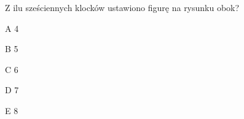 \begin{tresc}
Z ilu sześciennych klocków ustawiono figurę na rysunku obok?
\end{tresc}
\begin{wariant}{A} 4 \end{wariant}
\begin{wariant}{B} 5 \end{wariant}
\begin{wariant}{C} 6 \end{wariant}
\begin{wariant}{D} 7 \end{wariant}
\begin{wariant}{E} 8 \end{wariant}
